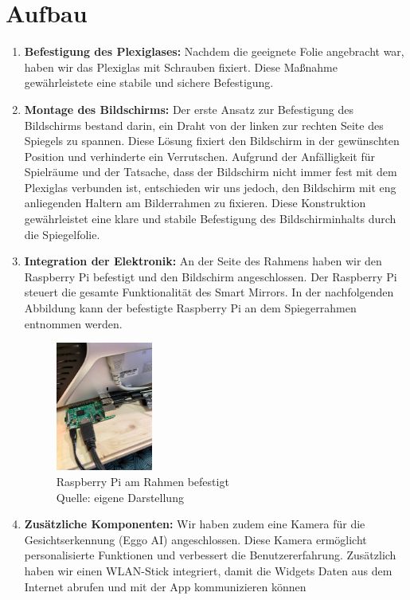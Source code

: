 \section{Aufbau}
\begin{enumerate}
    \item \textbf{Befestigung des Plexiglases:}
Nachdem die geeignete Folie angebracht war, haben wir das Plexiglas mit Schrauben fixiert. Diese Maßnahme gewährleistete eine stabile und sichere Befestigung.

    \item \textbf{Montage des Bildschirms:}
Der erste Ansatz zur Befestigung des Bildschirms bestand darin, ein Draht von der linken zur rechten Seite des Spiegels zu spannen. Diese Lösung fixiert den Bildschirm in der gewünschten Position und verhinderte ein Verrutschen. Aufgrund der Anfälligkeit für Spielräume und der Tatsache, dass der Bildschirm nicht immer fest mit dem Plexiglas verbunden ist, entschieden wir uns jedoch, den Bildschirm mit eng anliegenden Haltern am Bilderrahmen zu fixieren. Diese Konstruktion gewährleistet eine klare und stabile Befestigung des Bildschirminhalts durch die Spiegelfolie.
    
    \item \textbf{Integration der Elektronik:}
An der Seite des Rahmens haben wir den Raspberry Pi befestigt und den Bildschirm angeschlossen. Der Raspberry Pi steuert die gesamte Funktionalität des Smart Mirrors. In der nachfolgenden Abbildung kann der befestigte Raspberry Pi an dem Spiegerrahmen entnommen werden.
\begin{figure}[h]
    \centering
    \includegraphics[width=0.3\textwidth]{pictures/Raspberry_pi_Befestigung.jpg}
  \captionsetup{justification=centering, labelformat=simple, singlelinecheck=false}
    \caption[Raspberry Pi am Rahmen befestigt]{Raspberry Pi am Rahmen befestigt\\ Quelle: eigene Darstellung}
\end{figure}
\newpage
    \item \textbf{Zusätzliche Komponenten:}
    Wir haben zudem eine Kamera für die Gesichtserkennung (Eggo AI) angeschlossen. Diese Kamera ermöglicht personalisierte Funktionen und verbessert die Benutzererfahrung. Zusätzlich haben wir einen WLAN-Stick integriert, damit die Widgets Daten aus dem Internet abrufen und mit der App kommunizieren können

\end{enumerate}

